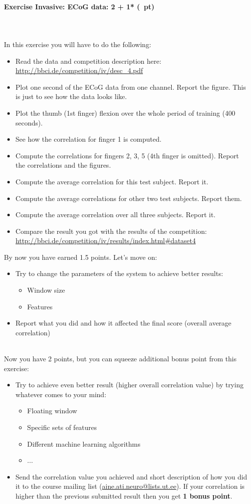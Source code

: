 \documentclass[a4paper,11pt]{article}
\newenvironment{exercise}[3]{\paragraph{Exercise #1: #2 (#3pt)}\ \\}{
\medskip}
\begin{document}
\begin{exercise}{2}{Invasive: ECoG data}{2 + 1* }
\ \\
In this exercise you will have to do the following:
\begin{itemize}
\itemsep 0em
	\item Read the data and competition description here: \url{http://bbci.de/competition/iv/desc_4.pdf}
	\item Plot one second of the ECoG data from one channel. Report the figure. This is just to see how the data looks like.
	\item Plot the thumb (1st finger) flexion over the whole period of training (400 seconds).
	\item See how the correlation for finger 1 is computed.
	\item Compute the correlations for fingers 2, 3, 5 (4th finger is omitted). Report the correlations and the figures.
	\item Compute the average correlation for this test subject. Report it.
	\item Compute the average correlations for other two test subjects. Report them.
	\item Compute the average correlation over all three subjects. Report it.
	\item Compare the result you got with the results of the competition: \url{http://bbci.de/competition/iv/results/index.html#dataset4}
\end{itemize}
By now you have earned 1.5 points. Let's move on:
\begin{itemize}
\itemsep 0em
	\item Try to change the parameters of the system to achieve better results:
	\begin{itemize}
		\item Window size
		\item Features
	\end{itemize}
	\item Report what you did and how it affected the final score (overall average correlation)
\end{itemize}
\ \\
Now you have 2 points, but you can squeeze additional bonus point from this exercise:
\begin{itemize}
	\item Try to achieve even better result (higher overall correlation value) by trying whatever comes to your mind:
	\begin{itemize}
		\item Floating window
		\item Specific sets of features
		\item Different machine learning algorithms
		\item ...
	\end{itemize}
	\item Send the correlation value you achieved and short description of how you did it to the course mailing list (\url{aine.ati.neuro@lists.ut.ee}). If your correlation is higher than the previous submitted result then you get \textbf{1 bonus point}.
\end{itemize}


\end{exercise}
\end{document}
